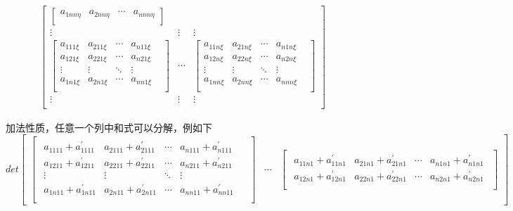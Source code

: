 \documentclass{amsc}          %
\numberwithin{equation}{section} %
\begin{document}
\begin{list}{}
\begin{align*}
\begin{bmatrix}
\begin{bmatrix}
  a_{1nn\eta }& a_{2nn\eta}&\cdots&a_{nnn\eta}\\
  \end{bmatrix}\\
\vdots&\vdots&\vdots\\
 \begin{bmatrix}
   a_{111\xi}& a_{211\xi}&\cdots&a_{n11\xi}\\
   a_{121\xi}& a_{221\xi}&\cdots&a_{n21\xi}\\
  \vdots&\vdots&\ddots &\vdots&\\
a_{1n1\xi}& a_{2n1\xi}&\cdots&a_{nn1\xi}\\
\end{bmatrix}&
\cdots&
\begin{bmatrix}
  a_{11n\xi}& a_{21n\xi}&\cdots&a_{n1n\xi}\\
  a_{12n\xi}& a_{22n\xi}&\cdots&a_{n2n\xi}\\
  \vdots&\vdots&\ddots &\vdots&\\
  a_{1nn\xi}& a_{2nn\xi}&\cdots&a_{nnn\xi}\\
  \end{bmatrix}\\
\vdots&\vdots&\vdots\\
    \end{bmatrix}
\end{align*}
 \item
 加法性质，任意一个列中和式可以分解，例如下
 $$det\begin{bmatrix}
 \begin{bmatrix}\begin{smallmatrix}
 a_{1111} + a_{1111}^{'}& a_{2111} + a_{2111}^{'}&\cdots&a_{n111} + a_{n111}^{'}\\
 a_{1211} + a_{1211}^{'}& a_{2211} + a_{2211}^{'}&\cdots&a_{n211} + a_{n211}^{'}\\
  \vdots&\vdots&\ddots &\vdots& \\
a_{1n11} + a_{1n11}^{'}& a_{2n11} + a_{2n11}^{'}&\cdots&a_{nn11} + a_{nn11}^{'}\\
\end{smallmatrix}\end{bmatrix}&
\cdots&
\begin{bmatrix}\begin{smallmatrix}
  a_{11n1} + a_{11n1}^{'}& a_{21n1} + a_{21n1}^{'}&\cdots&a_{n1n1} + a_{n1n1}^{'}\\
a_{12n1} + a_{12n1}^{'}& a_{22n1} + a_{22n1}^{'}&\cdots&a_{n2n1} + a_{n2n1}^{'}\\

\end{smallmatrix}
\end{bmatrix}
\end{bmatrix}$$
\end{list}
\end{document}
